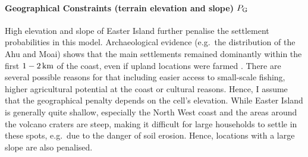 \paragraph{Geographical Constraints (terrain elevation and slope) $P_{\rm G}$}
High elevation and slope of Easter Island further penalise the settlement probabilities in this model.
Archaeological evidence (e.g.\ the distribution of the Ahu and Moai) shows that the main settlements remained dominantly within the first $1-2\, \rm{km}$ of the coast, even if upland locations were farmed \citep{Bahn2017}.
There are several possible reasons for that including easier access to small-scale fishing, higher agricultural potential at the coast or cultural reasons.
Hence, I assume that the geographical penalty depends on the cell's elevation.
While Easter Island is generally quite shallow, especially the North West coast and the areas around the volcano craters are steep, making it difficult for large households to settle in these spots, e.g.\ due to the danger of soil erosion. 
Hence, locations with a large slope are also penalised.
